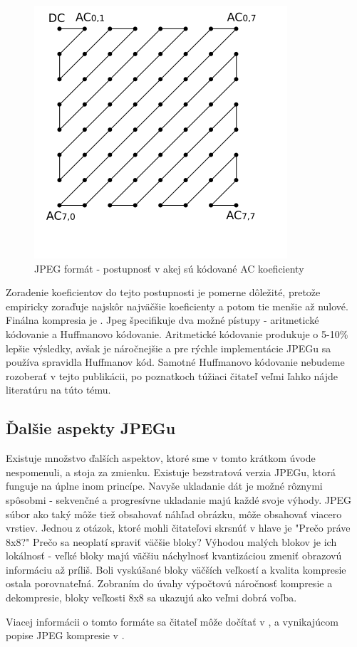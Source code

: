\begin{figure}[htp]
    \centering
    \includegraphics{obrazky/informatika/image_compression/zig_zag}
    \caption{JPEG formát - postupnosť v akej sú kódované AC koeficienty}
    \label{fig:jpeg_zig_zag}
\end{figure}

Zoradenie koeficientov
do tejto postupnosti je pomerne dôležité, pretože empiricky zoraďuje
najskôr najväčšie koeficienty a potom tie menšie až nulové.
Finálna kompresia je . Jpeg špecifikuje dva možné
pístupy - aritmetické kódovanie a Huffmanovo kódovanie. Aritmetické
kódovanie produkuje o 5-10\% lepšie výsledky, avšak je náročnejšie a
pre rýchle implementácie JPEGu sa používa spravidla Huffmanov kód.
Samotné Huffmanovo kódovanie nebudeme rozoberať v tejto publikácii,
po poznatkoch túžiaci čitateľ veľmi ľahko nájde literatúru na túto
tému.

\subsection{Ďalšie aspekty JPEGu}

Existuje množstvo ďalších aspektov, ktoré sme v tomto krátkom úvode
nespomenuli, a stoja za zmienku. Existuje bezstratová verzia JPEGu,
ktorá funguje na úplne inom princípe. Navyše ukladanie dát je možné
rôznymi spôsobmi - sekvenčné a progresívne ukladanie majú každé svoje
výhody. JPEG súbor ako taký môže tiež obsahovať náhľad obrázku, 
môže obsahovať viacero vrstiev.
Jednou z otázok, ktoré mohli čitateľovi skrsnúť v hlave je "Prečo
práve 8x8?" Prečo sa neoplatí spraviť väčšie bloky? Výhodou malých
blokov je ich lokálnosť - veľké bloky majú väčšiu náchylnosť
kvantizáciou zmeniť obrazovú informáciu až príliš. Boli vyskúšané
bloky väčších veľkostí a kvalita kompresie ostala porovnateľná.
Zobraním do úvahy výpočtovú náročnosť kompresie a dekompresie, bloky
veľkosti 8x8 sa ukazujú ako veľmi dobrá voľba.

Viacej informácii o tomto formáte sa čitateľ môže dočítať v
\cite{wiki:jfif}, \cite{wiki:jpeg} a vynikajúcom popise JPEG kompresie
v \cite{wallace1991}.

